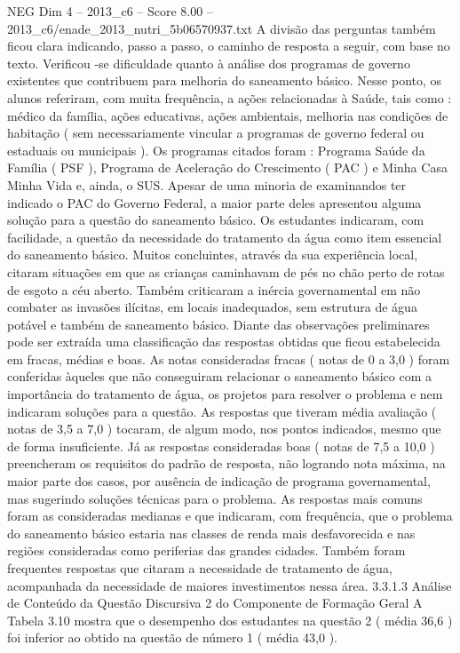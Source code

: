 \begin{textsample}{NEG Dim 4 – 2013\_c6 – Score 8.00 – 2013\_c6/enade\_2013\_nutri\_5b06570937.txt}
A divisão das perguntas também ficou clara indicando, passo a passo, o caminho de resposta a seguir, com base no texto.
Verificou -se dificuldade quanto à análise dos programas de governo existentes que contribuem para melhoria do saneamento básico.
Nesse ponto, os alunos referiram, com muita frequência, a ações relacionadas à Saúde, tais como : médico da família, ações educativas, ações ambientais, melhoria nas condições de habitação ( sem necessariamente vincular a programas de governo federal ou estaduais ou municipais ).
Os programas citados foram : Programa Saúde da Família ( PSF ), Programa de Aceleração do Crescimento ( PAC ) e Minha Casa Minha Vida e, ainda, o SUS.
Apesar de uma minoria de examinandos ter indicado o PAC do Governo Federal, a maior parte deles apresentou alguma solução para a questão do saneamento básico.
Os estudantes indicaram, com facilidade, a questão da necessidade do tratamento da água como item essencial do saneamento básico.
Muitos concluintes, através da sua experiência local, citaram situações em que as crianças caminhavam de pés no chão perto de rotas de esgoto a céu aberto.
Também criticaram a inércia governamental em não combater as invasões ilícitas, em locais inadequados, sem estrutura de água potável e também de saneamento básico.
Diante das observações preliminares pode ser extraída uma classificação das respostas obtidas que ficou estabelecida em fracas, médias e boas.
As notas consideradas fracas ( notas de 0 a 3,0 ) foram conferidas àqueles que não conseguiram relacionar o saneamento básico com a importância do tratamento de água, os projetos para resolver o problema e nem indicaram soluções para a questão.
As respostas que tiveram média avaliação ( notas de 3,5 a 7,0 ) tocaram, de algum modo, nos pontos indicados, mesmo que de forma insuficiente.
Já as respostas consideradas boas ( notas de 7,5 a 10,0 ) preencheram os requisitos do padrão de resposta, não logrando nota máxima, na maior parte dos casos, por ausência de indicação de programa governamental, mas sugerindo soluções técnicas para o problema.
As respostas mais comuns foram as consideradas medianas e que indicaram, com frequência, que o problema do saneamento básico estaria nas classes de renda mais desfavorecida e nas regiões consideradas como periferias das grandes cidades.
Também foram frequentes respostas que citaram a necessidade de tratamento de água, acompanhada da necessidade de maiores investimentos nessa área. 3.3.1.3 Análise de Conteúdo da Questão Discursiva 2 do Componente de Formação Geral A Tabela 3.10 mostra que o desempenho dos estudantes na questão 2 ( média 36,6 ) foi inferior ao obtido na questão de número 1 ( média 43,0 ).

\end{textsample}
